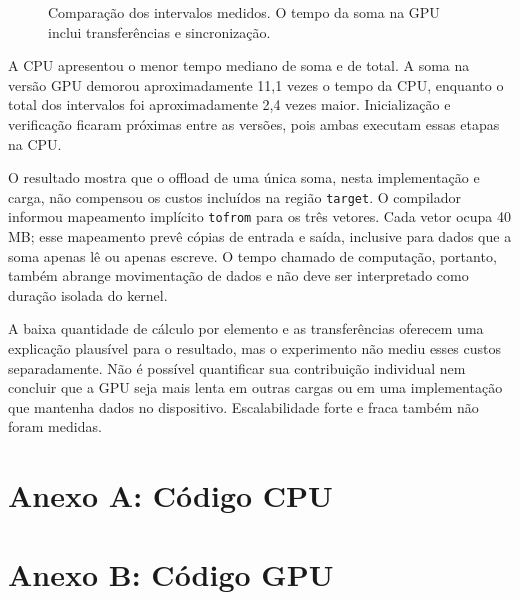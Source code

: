 \documentclass[11pt,letterpaper]{article}
\begin{document}
\begin{figure}[H]
\centering
{}
\caption{Comparação dos intervalos medidos. O tempo da soma na GPU inclui transferências e sincronização.}
\label{fig:tempos}
\end{figure}

A CPU apresentou o menor tempo mediano de soma e de total. A soma na versão GPU demorou aproximadamente 11,1 vezes o tempo da CPU, enquanto o total dos intervalos foi aproximadamente 2,4 vezes maior. Inicialização e verificação ficaram próximas entre as versões, pois ambas executam essas etapas na CPU.

O resultado mostra que o offload de uma única soma, nesta implementação e carga, não compensou os custos incluídos na região \texttt{target}. O compilador informou mapeamento implícito \texttt{tofrom} para os três vetores. Cada vetor ocupa 40 MB; esse mapeamento prevê cópias de entrada e saída, inclusive para dados que a soma apenas lê ou apenas escreve. O tempo chamado de computação, portanto, também abrange movimentação de dados e não deve ser interpretado como duração isolada do kernel.

A baixa quantidade de cálculo por elemento e as transferências oferecem uma explicação plausível para o resultado, mas o experimento não mediu esses custos separadamente. Não é possível quantificar sua contribuição individual nem concluir que a GPU seja mais lenta em outras cargas ou em uma implementação que mantenha dados no dispositivo. Escalabilidade forte e fraca também não foram medidas.

\appendix
\clearpage
\section*{Anexo A: Código CPU}


\clearpage
\section*{Anexo B: Código GPU}

\end{document}
